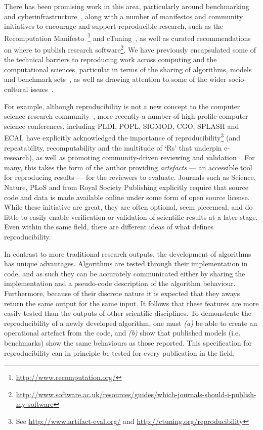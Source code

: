 \documentclass[conference]{IEEEtran}
\begin{document}
There has been promising work in this area, particularly around
benchmarking and
cyberinfrastructure~\cite{sim-et-al:2003,chirigati-et-al:2013,stodden+miguez:2014,stodden-et-al:2015},
along with a number of manifestos and community initiatives to
encourage and support reproducible research, such as the Recomputation
Manifesto~\cite{gent:2013}\footnote{\url{http://www.recomputation.org/}}
and cTuning~\cite{fursin-et-al:2014}, as well as curated
recommendations on where to publish research
software\footnote{\url{http://www.software.ac.uk/resources/guides/which-journals-should-i-publish-my-software}}. We
have previously encapsulated some of the technical barriers to
reproducing work across computing and the computational sciences,
particular in terms of the sharing of algorithms, models and benchmark
sets~\cite{crick-et-al_wssspe2,crick-et-al_recomp2014,crick-et-al:2015},
as well as drawing attention to some of the wider socio-cultural
issues~\cite{chuehong-et-al:2015}.

For example, although reproducibility is not a new concept to the computer
science research community~\cite{price:1986}, more recently a number
of high-profile computer science conferences, including PLDI, POPL,
SIGMOD, CGO, SPLASH and ECAI, have explicitly acknowledged the
importance of reproducibility\footnote{See
\url{http://www.artifact-eval.org/} and
\url{http://ctuning.org/reproducibility}} (and repeatability,
recomputability and the multitude of `Rs' that underpin e-research),
as well as promoting community-driven reviewing and
validation~\cite{fursin+dubach:2014}.  For many, this takes the form
of the author providing \emph{artefacts} --- an accessible tool for
reproducing results --- for the reviewers to evaluate. Journals such
as Science, Nature, PLoS and from Royal Society Publishing explicitly
require that source code and data is made available online under some
form of open source license. While these initiative are great, they
are often optional, seem piecemeal, and do little to easily enable
verification or validation of scientific results at a later
stage. Even within the same field, there are different ideas of what
defines reproducibility.

In contrast to more traditional research outputs, the development of
algorithms has unique advantages. Algorithms are tested through their
implementation in code, and as such they can be accurately
communicated either by sharing the implementation and a pseudo-code
description of the algorithm behaviour. Furthermore, because of their
discrete nature it is expected that they aways return the same output
for the same input. It follows that these features are more easily
tested than the outputs of other scientific disciplines. To
demonstrate the reproducibility of a newly developed algorithm, one
must {\emph{(a)}} be able to create an operational artefact from the
code, and {\emph{(b)}} show that published models (i.e. benchmarks)
show the same behaviours as those reported. This specification for
reproducibility can in principle be tested for every publication in
the field.
\end{document}
